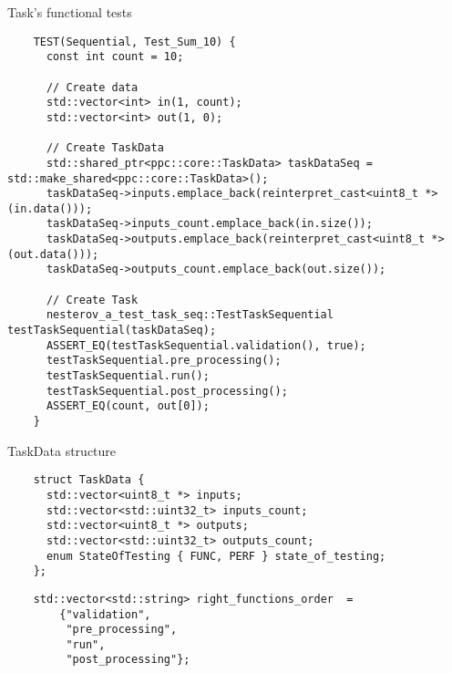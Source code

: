 \documentclass{beamer}
\begin{document}
\begin{frame}[fragile]{Task's functional tests}
  \lstset{style=CStyle, caption=func\_tests/main.cpp}
  \begin{lstlisting}
    TEST(Sequential, Test_Sum_10) {
      const int count = 10;
    
      // Create data
      std::vector<int> in(1, count);
      std::vector<int> out(1, 0);
    
      // Create TaskData
      std::shared_ptr<ppc::core::TaskData> taskDataSeq = std::make_shared<ppc::core::TaskData>();
      taskDataSeq->inputs.emplace_back(reinterpret_cast<uint8_t *>(in.data()));
      taskDataSeq->inputs_count.emplace_back(in.size());
      taskDataSeq->outputs.emplace_back(reinterpret_cast<uint8_t *>(out.data()));
      taskDataSeq->outputs_count.emplace_back(out.size());
    
      // Create Task
      nesterov_a_test_task_seq::TestTaskSequential testTaskSequential(taskDataSeq);
      ASSERT_EQ(testTaskSequential.validation(), true);
      testTaskSequential.pre_processing();
      testTaskSequential.run();
      testTaskSequential.post_processing();
      ASSERT_EQ(count, out[0]);
    }    
  \end{lstlisting}
\end{frame}

\begin{frame}[fragile]{TaskData structure}
  \lstset{style=CStyle, caption=TaskData}
  \begin{lstlisting}
    struct TaskData {
      std::vector<uint8_t *> inputs;
      std::vector<std::uint32_t> inputs_count;
      std::vector<uint8_t *> outputs;
      std::vector<std::uint32_t> outputs_count;
      enum StateOfTesting { FUNC, PERF } state_of_testing;
    };
  \end{lstlisting}
  \lstset{style=CStyle, caption=Functions order}
  \begin{lstlisting}
    std::vector<std::string> right_functions_order  = 
        {"validation", 
         "pre_processing", 
         "run", 
         "post_processing"};
  \end{lstlisting}
\end{frame}
\end{document}
